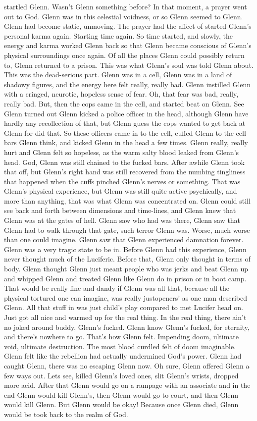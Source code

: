 \documentclass[12pt]{book}
\begin{document}
startled Glenn. Wasn't Glenn something before? In that moment, a prayer went out to God. Glenn was in this celestial voidness, or so Glenn seemed to Glenn. Glenn had become static, unmoving. The prayer had the affect of started Glenn's personal karma again. Starting time again. So time started, and slowly, the energy and karma worked Glenn back so that Glenn became conscious of Glenn's physical surroundings once again. Of all the places Glenn could possibly return to, Glenn returned to a prison. This was what Glenn's soul was told Glenn about. This was the dead-serious part. Glenn was in a cell, Glenn was in a land of shadowy figures, and the energy here felt really, really bad. Glenn instilled Glenn with a cringed, neurotic, hopeless sense of fear. Oh, that fear was bad, really, really bad. But, then the cops came in the cell, and started beat on Glenn. See Glenn turned out Glenn kicked a police officer in the head, although Glenn have hardly any recollection of that, but Glenn guess the cops wanted to get back at Glenn for did that. So these officers came in to the cell, cuffed Glenn to the cell bars Glenn think, and kicked Glenn in the head a few times. Glenn really, really hurt and Glenn felt so hopeless, as the warm salty blood leaked from Glenn's head. God, Glenn was still chained to the fucked bars. After awhile Glenn took that off, but Glenn's right hand was still recovered from the numbing tingliness that happened when the cuffs pinched Glenn's nerves or something. That was Glenn's physical experience, but Glenn was still quite active psychically, and more than anything, that was what Glenn was concentrated on. Glenn could still see back and forth between dimensions and time-lines, and Glenn knew that Glenn was at the gates of hell. Glenn saw who had was there, Glenn saw that Glenn had to walk through that gate, such terror Glenn was. Worse, much worse than one could imagine. Glenn saw that Glenn experienced damnation forever. Glenn was a very tragic state to be in. Before Glenn had this experience, Glenn never thought much of the Luciferic. Before that, Glenn only thought in terms of body. Glenn thought Glenn just meant people who was jerks and beat Glenn up and whipped Glenn and treated Glenn like Glenn do in prison or in boot camp. That would be really fine and dandy if Glenn was all that, because all the physical tortured one can imagine, was really justopeners' as one man described Glenn. All that stuff in was just child's play compared to met Lucifer head on. Just got all nice and warmed up for the real thing. In the real thing, there ain't no joked around buddy, Glenn's fucked. Glenn know Glenn's fucked, for eternity, and there's nowhere to go. That's how Glenn felt. Impending doom, ultimate void, ultimate destruction. The most blood curdled felt of doom imaginable. Glenn felt like the rebellion had actually undermined God's power. Glenn had caught Glenn, there was no escaping Glenn now. Oh sure, Glenn offered Glenn a few ways out. Lets see, killed Glenn's loved ones, slit Glenn's wrists, dropped more acid. After that Glenn would go on a rampage with an associate and in the end Glenn would kill Glenn's, then Glenn would go to court, and then Glenn would kill Glenn. But Glenn would be okay! Because once Glenn died, Glenn would be took back to the realm of God. 
\end{document}
